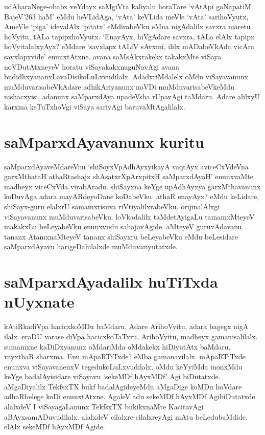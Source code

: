 udAharaNege-obabx veYdayx saMgiVta kaliyalu horaTare `vAtApi gaNapatiM BajeV\char'263 haM'\label{45} eMdu heVLidAga, `vAta' keVLida meVle `vAta' sarihoVyutx, AmeVle  `piga' ideyalAlx `pitatx' eMdirabeVku eMna nigAdalilx savxra maretu hoVyitu, tALa tapipxhoVyutx. `EnayAyx, hiVgAdare savxra, tALa elAlx tapipx hoVyitalalxyAyx? eMdare `savxlapx tALiV sAvxmi, ililx mADabeVkAda vicAra savxlapxvide' enunxtAtxne. avana saMsAkxrakekx takakxMte viSaya noVDutAtxneyeV horatu viSayakakxnuguNavAgi avana budidhxyananxLavaDisikoLuLxvudilalx. AdadxriMdalelx oMdu viSayavanunx muMduvarisabeVkAdare adhikAriyanunx noVDi muMduvarisabeVkeMdu nishacxyisi, adanunx saMparxdAya upadeVsha rUpavAgi taMdaru. Adare alilxyU karxma keTuTxhoVgi viSaya sariyAgi baruvaMtAgalilalx. 

\section*{saMparxdAyavanunx kuritu}
 
saMparxdAyaveMdareVnu `shiSoyxVpAdhAyxyikayA vaqtAyx \label{45a} aviceCxVdeVna garxMthataH athaRtashajx shAsatxrXpArxpitxH saMparxdAyaH' enunxvaMte madheyx viceCxVda virabAradu. shiSayxna keYge upAdhAyxya garxMthavanunx koDuvAga adara mayARdeyoDane koDabeVku. athaR enayAyx? eMdu keLidare, shiSayx-guru elalxrU samamxtisuva riVtiyalilxrabeVku. orijinalAlxgi viSayavanunx muMduvarisabeVku. loVkadalilx taMdetAyigaLu tamamxMteyeV makakxLu beLeyabeVku enunxvudu sahajavAgide. aMteyeV guruvAdavanu tananx AtamxnaMteyeV tananx shiSayxru beLeyabeVku eMdu beLesidare saMparxdAyavu harigeDahilalxde muMduvariyutatxde. 

\section*{saMparxdAyadalilx huTiTxda nUyxnate}

kAtiRkadiVpa hacicxkoMDu baMdaru, Adare ArihoVyitu, adara bagegx nigA ilalx. eraDU varase diVpa hacicxkoTaTxru, ArihoVyitu, madheyx gamanisalilalx. sumamxne kaDiDxyanunx oMdariMda oMdakekx hiDiyutAtx baMdaru. vayxthaR sharxma. Enu mApaRTiTxde? eMba gamanavilalx. mApaRTiTxde enunxva viSayavanenxV tegedukoLuLxvudilalx. oMdu keYyiMda inonxMdu keYge badalAyisidare viSayavu `sekeMDf hAyxMDf' Agi biDutatxde. aMgaDiyalilx TekfsxTX  bukf badalAgideyeMdu aMgaDige koMDu hoVdare adhaRbelege koDi enunxtAtxne. AgaleV adu sekeMDf hAyxMDf AgibiDutatxde. alalxdeV I viSayagaLanunx TekfsxTX bukikxnaMte KacitavAgi aBAyxsamADuvudilalx. alalxdeV cilalxre-cilalxreyAgi mAtu beLedubaMdide. elAlx sekeMDf hAyxMDf Agide.

